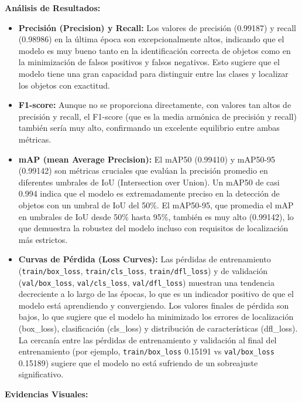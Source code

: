\documentclass[10pt,a4paper]{report}
\begin{document}
\textbf{Análisis de Resultados:}

\begin{itemize}
    \item \textbf{Precisión (Precision) y Recall:} Los valores de precisión (0.99187) y recall (0.98986) en la última época son excepcionalmente altos, indicando que el modelo es muy bueno tanto en la identificación correcta de objetos como en la minimización de falsos positivos y falsos negativos. Esto sugiere que el modelo tiene una gran capacidad para distinguir entre las clases y localizar los objetos con exactitud.

    \item \textbf{F1-score:} Aunque no se proporciona directamente, con valores tan altos de precisión y recall, el F1-score (que es la media armónica de precisión y recall) también sería muy alto, confirmando un excelente equilibrio entre ambas métricas.

    \item \textbf{mAP (mean Average Precision):} El mAP50 (0.99410) y mAP50-95 (0.99142) son métricas cruciales que evalúan la precisión promedio en diferentes umbrales de IoU (Intersection over Union). Un mAP50 de casi 0.994 indica que el modelo es extremadamente preciso en la detección de objetos con un umbral de IoU del 50\%. El mAP50-95, que promedia el mAP en umbrales de IoU desde 50\% hasta 95\%, también es muy alto (0.99142), lo que demuestra la robustez del modelo incluso con requisitos de localización más estrictos.

    \item \textbf{Curvas de Pérdida (Loss Curves):} Las pérdidas de entrenamiento (\texttt{train/box\_loss}, \texttt{train/cls\_loss}, \texttt{train/dfl\_loss}) y de validación (\texttt{val/box\_loss}, \texttt{val/cls\_loss}, \texttt{val/dfl\_loss}) muestran una tendencia decreciente a lo largo de las épocas, lo que es un indicador positivo de que el modelo está aprendiendo y convergiendo. Los valores finales de pérdida son bajos, lo que sugiere que el modelo ha minimizado los errores de localización (box\_loss), clasificación (cls\_loss) y distribución de características (dfl\_loss). La cercanía entre las pérdidas de entrenamiento y validación al final del entrenamiento (por ejemplo, \texttt{train/box\_loss} 0.15191 vs \texttt{val/box\_loss} 0.15189) sugiere que el modelo no está sufriendo de un sobreajuste significativo.
\end{itemize}

\textbf{Evidencias Visuales:}
\end{document}
